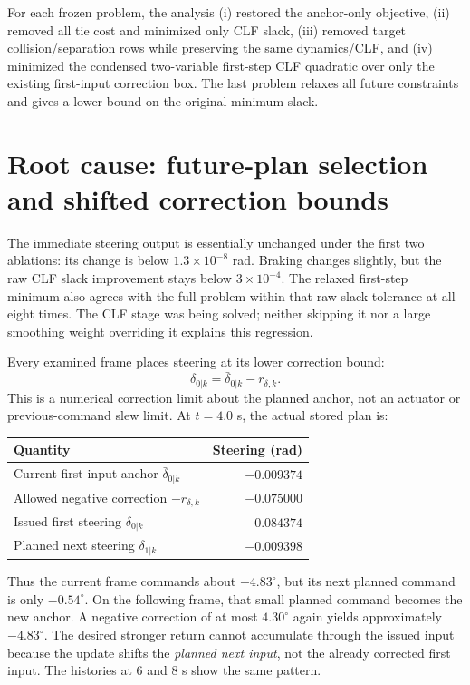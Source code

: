 \documentclass[10pt]{article}
\begin{document}
For each frozen problem, the analysis (i) restored the anchor-only objective,
(ii) removed all tie cost and minimized only CLF slack, (iii) removed target
collision/separation rows while preserving the same dynamics/CLF, and
(iv) minimized the condensed two-variable first-step CLF quadratic over only
the existing first-input correction box. The last problem relaxes all future
constraints and gives a lower bound on the original minimum slack.

\section{Root cause: future-plan selection and shifted correction bounds}
The immediate steering output is essentially unchanged under the first two
ablations: its change is below $1.3\times10^{-8}$ rad. Braking changes slightly,
but the raw CLF slack improvement stays below $3\times10^{-4}$. The relaxed
first-step minimum also agrees with the full problem within that raw slack
tolerance at all eight times. The CLF stage was being solved; neither skipping
it nor a large smoothing weight overriding it explains this regression.

Every examined frame places steering at its lower correction bound:
\[
 \delta_{0|k}=\bar\delta_{0|k}-r_{\delta,k}.
\]
This is a numerical correction limit about the planned anchor, not an actuator
or previous-command slew limit. At $t=4.0$ s, the actual stored plan is:
\begin{center}\begin{tabular}{lr}\toprule
Quantity & Steering (rad)\\\midrule
Current first-input anchor $\bar\delta_{0|k}$ & $-0.009374$\\
Allowed negative correction $-r_{\delta,k}$ & $-0.075000$\\
Issued first steering $\delta_{0|k}$ & $-0.084374$\\
Planned next steering $\delta_{1|k}$ & $-0.009398$\\
\bottomrule\end{tabular}\end{center}
Thus the current frame commands about $-4.83^\circ$, but its next planned
command is only $-0.54^\circ$. On the following frame, that small planned
command becomes the new anchor. A negative correction of at most
$4.30^\circ$ again yields approximately $-4.83^\circ$. The desired stronger
return cannot accumulate through the issued input because the update shifts
the \emph{planned next input}, not the already corrected first input.
The histories at 6 and 8 s show the same pattern.
\end{document}
